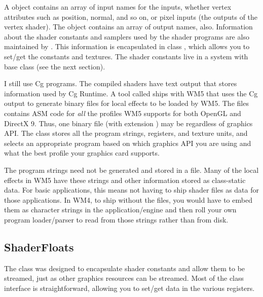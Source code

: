 \documentclass{article}
\begin{document}
A  object contains an array of input names for the inputs,
whether vertex attributes such as position, normal, and so on, or pixel
inputs (the outputs of the vertex shader).  The object contains an array
of output names, also.  Information about the shader constants and samplers
used by the shader programs are also maintained by .  This
information is encapsulated in class , which allows
you to set/get the constants and textures.  The shader constants live in
a system with base class  (see the next section).

I still use Cg programs.  The compiled shaders have text output that stores
information used by Cg Runtime.  A tool called  ships with
WM5 that uses the Cg output to generate binary files for local effects to be
loaded by WM5.  The files contains ASM code for {\em all} the profiles WM5
supports for both OpenGL and DirectX 9.  Thus, one binary file (with
extension ) may be regardless of graphics API.  The 
class stores all the program strings, registers, and texture units, and
selects an appropriate program based on which graphics API you are using
and what the best profile your graphics card supports.

The program strings need not be generated and stored in a  file.
Many of the local effects in WM5 have these strings and other information
stored as class-static data.  For basic applications, this means not having
to ship shader files as data for those applications.  In WM4, to ship without
the  files, you would have to embed them as character strings in
the application/engine and then roll your own program loader/parser to
read from those strings rather than from disk.

\subsection{ShaderFloats}

The  class was designed to encapsulate shader constants
and allow them to be streamed, just as other graphics resources can be
streamed.  Most of the class interface is straightforward, allowing you
to set/get data in the various registers.
\end{document}
